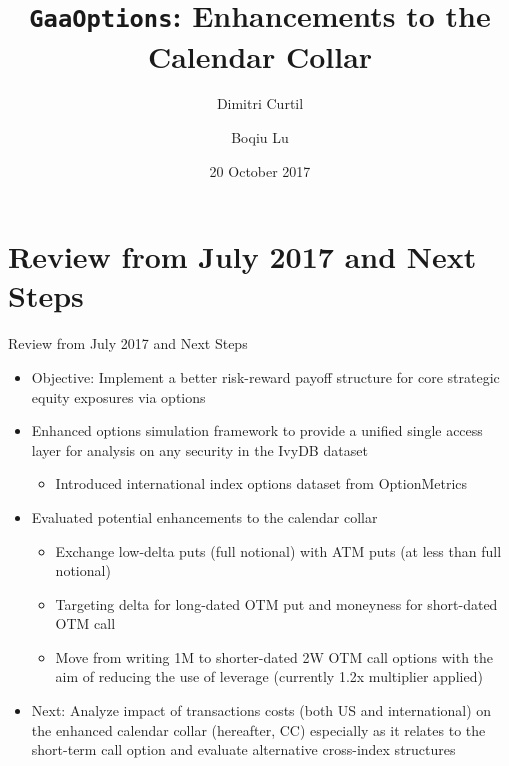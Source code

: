 \documentclass{beamer}
\title[{\tt GaaOptions}]{{\tt GaaOptions}: Enhancements to the Calendar Collar}
\author[DC $|$ BL]{Dimitri Curtil  \and Boqiu Lu}
\date{20 October 2017}
\begin{document}
\begin{frame}
  \titlepage
\end{frame}

\section{Review from July 2017 and Next Steps}
\begin{frame}{Review from July 2017 and Next Steps}
\begin{itemize}
\item Objective: Implement a better risk-reward payoff structure for core strategic equity exposures via options
\vfill
\item Enhanced options simulation framework to provide a unified single access layer for analysis on any security in the IvyDB dataset
\begin{itemize}
	\item Introduced international index options dataset from OptionMetrics
\end{itemize}
\vfill
\item Evaluated potential enhancements to the calendar collar
	\begin{itemize}
	\item Exchange low-delta puts (full notional) with ATM puts (at less than full notional)
	\item Targeting delta for long-dated OTM put and moneyness for short-dated OTM call
	\item Move from writing 1M to shorter-dated 2W OTM call options with the aim of reducing the use of leverage (currently 1.2x multiplier applied)
	\end{itemize}
\item Next: Analyze impact of transactions costs (both US and international) on the enhanced calendar collar (hereafter, CC) especially as it relates to the short-term call option and evaluate alternative cross-index structures
\vfill
\end{itemize}
\end{frame}
\end{document}
